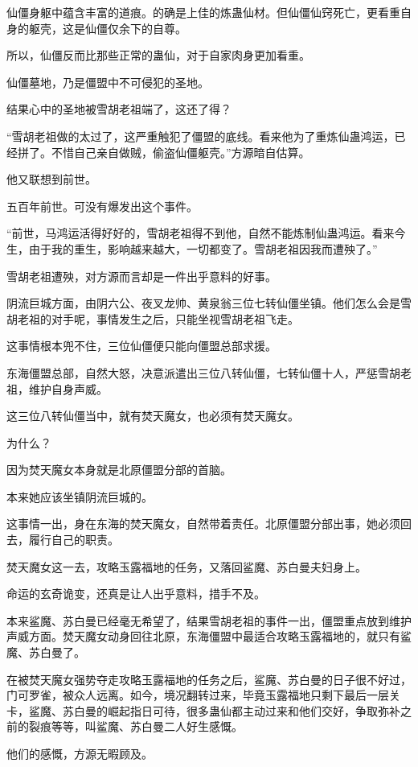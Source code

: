 \begin{this_body}
仙僵身躯中蕴含丰富的道痕。的确是上佳的炼蛊仙材。但仙僵仙窍死亡，更看重自身的躯壳，这是仙僵仅余下的自尊。

所以，仙僵反而比那些正常的蛊仙，对于自家肉身更加看重。

仙僵墓地，乃是僵盟中不可侵犯的圣地。

结果心中的圣地被雪胡老祖端了，这还了得？

“雪胡老祖做的太过了，这严重触犯了僵盟的底线。看来他为了重炼仙蛊鸿运，已经拼了。不惜自己亲自做贼，偷盗仙僵躯壳。”方源暗自估算。

他又联想到前世。

五百年前世。可没有爆发出这个事件。

“前世，马鸿运活得好好的，雪胡老祖得不到他，自然不能炼制仙蛊鸿运。看来今生，由于我的重生，影响越来越大，一切都变了。雪胡老祖因我而遭殃了。”

雪胡老祖遭殃，对方源而言却是一件出乎意料的好事。

阴流巨城方面，由阴六公、夜叉龙帅、黄泉翁三位七转仙僵坐镇。他们怎么会是雪胡老祖的对手呢，事情发生之后，只能坐视雪胡老祖飞走。

这事情根本兜不住，三位仙僵便只能向僵盟总部求援。

东海僵盟总部，自然大怒，决意派遣出三位八转仙僵，七转仙僵十人，严惩雪胡老祖，维护自身声威。

这三位八转仙僵当中，就有焚天魔女，也必须有焚天魔女。

为什么？

因为焚天魔女本身就是北原僵盟分部的首脑。

本来她应该坐镇阴流巨城的。

这事情一出，身在东海的焚天魔女，自然带着责任。北原僵盟分部出事，她必须回去，履行自己的职责。

焚天魔女这一去，攻略玉露福地的任务，又落回鲨魔、苏白曼夫妇身上。

命运的玄奇诡变，还真是让人出乎意料，措手不及。

本来鲨魔、苏白曼已经毫无希望了，结果雪胡老祖的事件一出，僵盟重点放到维护声威方面。焚天魔女动身回往北原，东海僵盟中最适合攻略玉露福地的，就只有鲨魔、苏白曼了。

在被焚天魔女强势夺走攻略玉露福地的任务之后，鲨魔、苏白曼的日子很不好过，门可罗雀，被众人远离。如今，境况翻转过来，毕竟玉露福地只剩下最后一层关卡，鲨魔、苏白曼的崛起指日可待，很多蛊仙都主动过来和他们交好，争取弥补之前的裂痕等等，叫鲨魔、苏白曼二人好生感慨。

他们的感慨，方源无暇顾及。


\end{this_body}
